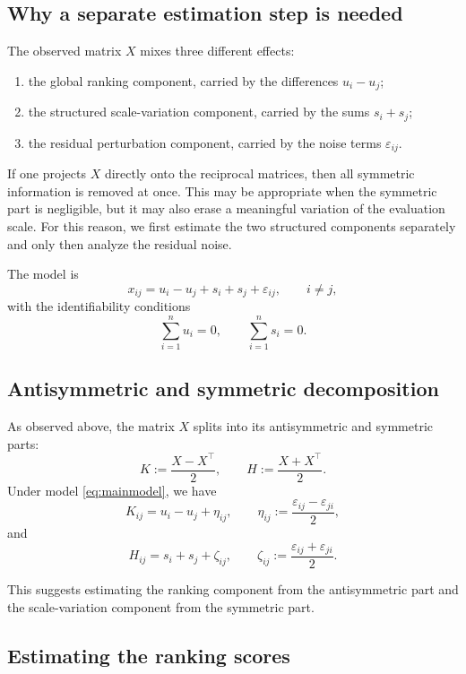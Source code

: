 \documentclass[11pt]{amsart}
\theoremstyle{definition}
\theoremstyle{plain}
\numberwithin{equation}{section}
\begin{document}
\subsection{Why a separate estimation step is needed}

The observed matrix $X$ mixes three different effects:
\begin{enumerate}[label=\textup{(\arabic*)}]
\item the global ranking component, carried by the differences $u_i-u_j$;
\item the structured scale-variation component, carried by the sums $s_i+s_j$;
\item the residual perturbation component, carried by the noise terms $\varepsilon_{ij}$.
\end{enumerate}

If one projects $X$ directly onto the reciprocal matrices, then all symmetric information is removed at once. This may be appropriate when the symmetric part is negligible, but it may also erase a meaningful variation of the evaluation scale. For this reason, we first estimate the two structured components separately and only then analyze the residual noise.

The model is
\begin{equation}\label{eq:mainmodel}
x_{ij}=u_i-u_j+s_i+s_j+\varepsilon_{ij},
\qquad i\neq j,
\end{equation}
with the identifiability conditions
\[
\sum_{i=1}^n u_i=0,
\qquad
\sum_{i=1}^n s_i=0.
\]

\subsection{Antisymmetric and symmetric decomposition}

As observed above, the matrix $X$ splits into its antisymmetric and symmetric parts:
\[
K:=\frac{X-X^\top}{2},
\qquad
H:=\frac{X+X^\top}{2}.
\]
Under model \eqref{eq:mainmodel}, we have
\[
K_{ij}=u_i-u_j+\eta_{ij},
\qquad
\eta_{ij}:=\frac{\varepsilon_{ij}-\varepsilon_{ji}}{2},
\]
and
\[
H_{ij}=s_i+s_j+\zeta_{ij},
\qquad
\zeta_{ij}:=\frac{\varepsilon_{ij}+\varepsilon_{ji}}{2}.
\]

This suggests estimating the ranking component from the antisymmetric part and the scale-variation component from the symmetric part.

\subsection{Estimating the ranking scores}
\end{document}
